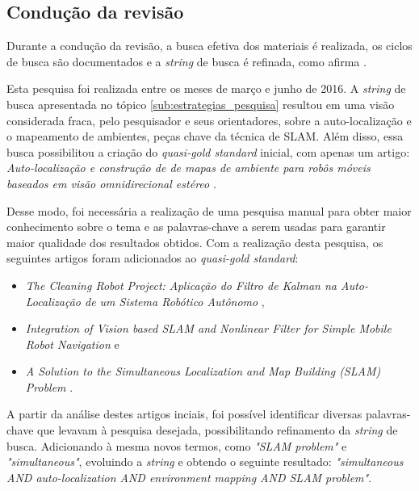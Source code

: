 		

	\subsection{Condução da revisão} %
	\label{sub:conducaoRevisao}
		
		Durante a condução da revisão, a busca efetiva dos materiais é realizada, os ciclos de busca são documentados e a \textit{string} de busca é refinada, como afirma \cite{estudoPrimarioSecundario}.

		Esta pesquisa foi realizada entre os meses de março e junho de 2016. A \textit{string} de busca apresentada no tópico \ref{sub:estrategias_pesquisa} resultou em uma visão considerada fraca, pelo pesquisador e seus orientadores, sobre a auto-localização e o mapeamento de ambientes, peças chave da técnica de SLAM. Além disso, essa busca possibilitou a criação do \textit{quasi-gold standard} inicial, com apenas um artigo: \textit{Auto-localização e construção de de mapas de ambiente para robôs móveis baseados em visão omnidirecional estéreo} \cite{localizacaoEMapeamentoPaulo}. 

		Desse modo, foi necessária a realização de uma pesquisa manual para obter maior conhecimento sobre o tema e as palavras-chave a serem usadas para garantir maior qualidade dos resultados obtidos. Com a realização desta pesquisa, os seguintes artigos foram adicionados ao \textit{quasi-gold standard}:

		\begin{itemize}
			\item \textit{The Cleaning Robot Project: Aplicação do Filtro de Kalman na Auto-Localização de um Sistema Robótico Autônomo} \cite{theCleaningProject},
			\item \textit{Integration of Vision based SLAM and Nonlinear Filter for Simple Mobile Robot Navigation} \cite{integrationVisionSLAMnonlinear} e
			\item \textit{A Solution to the Simultaneous Localization and Map Building (SLAM) Problem} \cite{slamProblem}.
		\end{itemize}

		A partir da análise destes artigos inciais, foi possível identificar diversas palavras-chave que levavam à pesquisa desejada, possibilitando refinamento da \textit{string} de busca. Adicionando à mesma novos termos, como \textit{"SLAM problem"} e \textit{"simultaneous"}, evoluindo a \textit{string} e obtendo o seguinte resultado: \textit{"simultaneous AND auto-localization AND environment mapping AND SLAM problem"}.
		
